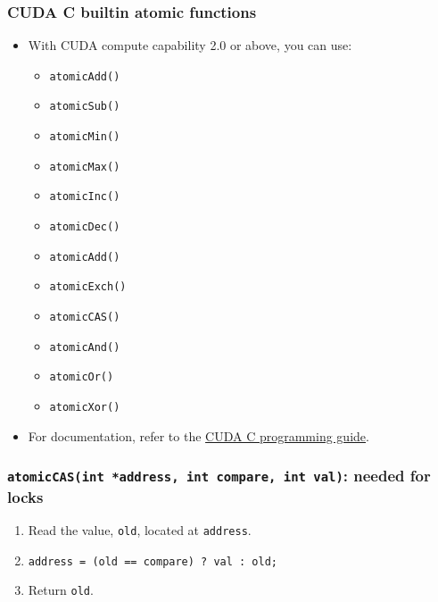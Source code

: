 \documentclass[handout]{beamer}
\numberwithin{equation}{section}
\begin{document}
\begin{frame}
\frametitle{CUDA C builtin atomic functions}

\begin{itemize}
\item With CUDA compute capability 2.0 or above, you can use:
\begin{itemize}
\item {\tt atomicAdd()}
\item {\tt atomicSub()}
\item {\tt atomicMin()}
\item {\tt atomicMax()}
\item {\tt atomicInc()}
\item {\tt atomicDec()}
\item {\tt atomicAdd()}
\item {\tt atomicExch()}
\item {\tt atomicCAS()}
\item {\tt atomicAnd()}
\item {\tt atomicOr()}
\item {\tt atomicXor()}
\end{itemize}
\pause \item For documentation, refer to the \href{http://docs.nvidia.com/cuda/cuda-c-programming-guide/index.html}{CUDA C programming guide}.
\end{itemize}
\end{frame}


\begin{frame}
\frametitle{{\tt atomicCAS(int *address, int compare, int val)}: needed for locks}
\begin{enumerate}
\pause \item Read the value, {\tt old}, located at {\tt address}.
\pause \item {\tt *address = (old == compare) ? val : old;}
\pause \item Return {\tt old}.
\end{enumerate}
\end{frame}
\end{document}
